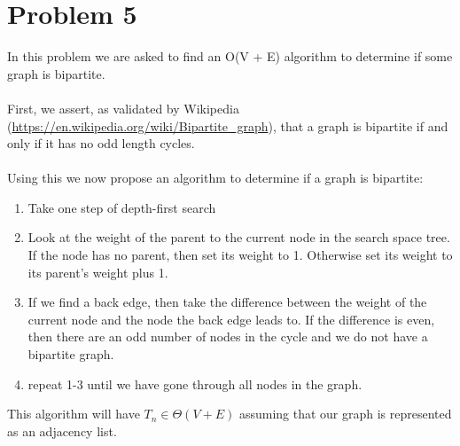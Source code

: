 \section*{Problem 5}

In this problem we are asked to find an O(V + E) algorithm to determine
if some graph is bipartite.
\\
\\
First, we assert, as validated by Wikipedia
(\url{https://en.wikipedia.org/wiki/Bipartite_graph}), that a graph is 
bipartite if and only if it has no odd length cycles.
\\
\\
Using this we now propose an algorithm to determine if a graph is 
bipartite:

\begin{enumerate}[noitemsep]
    \item Take one step of depth-first search
    \item Look at the weight of the parent to the current node in the
          search space tree. If the node has no parent, then set its 
          weight to 1. Otherwise set its weight to its parent's weight
          plus 1.
    \item If we find a back edge, then take the difference between the 
          weight of the current node and the node the back edge leads
          to. If the difference is even, then there are an odd number of
          nodes in the cycle and we do not have a bipartite graph.
    \item repeat 1-3 until we have gone through all nodes in the graph.
\end{enumerate}
%
This algorithm will have $T_n \in \Theta(V + E)$ assuming that our
graph is represented as an adjacency list.
